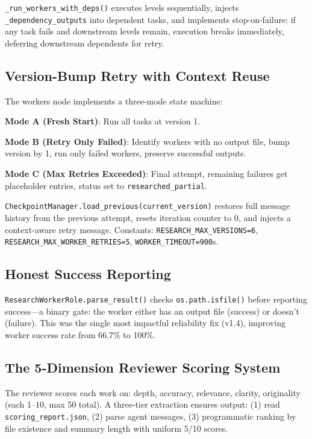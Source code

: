 \texttt{\_run\_workers\_with\_deps()} executes levels sequentially, injects \texttt{\_dependency\_outputs} into dependent tasks, and implements stop-on-failure: if any task fails and downstream levels remain, execution breaks immediately, deferring downstream dependents for retry.

\subsection{Version-Bump Retry with Context Reuse}

The workers node implements a three-mode state machine:

\textbf{Mode A (Fresh Start)}: Run all tasks at version 1.

\textbf{Mode B (Retry Only Failed)}: Identify workers with no output file, bump version by 1, run only failed workers, preserve successful outputs.

\textbf{Mode C (Max Retries Exceeded)}: Final attempt, remaining failures get placeholder entries, status set to \texttt{researched\_partial}.

\texttt{CheckpointManager.load\_previous(current\_version)} restores full message history from the previous attempt, resets iteration counter to 0, and injects a context-aware retry message. Constants: \texttt{RESEARCH\_MAX\_VERSIONS=6}, \texttt{RESEARCH\_MAX\_WORKER\_RETRIES=5}, \texttt{WORKER\_TIMEOUT=900}s.

\subsection{Honest Success Reporting}

\texttt{ResearchWorkerRole.parse\_result()} checks \texttt{os.path.isfile()} before reporting success---a binary gate: the worker either has an output file (success) or doesn't (failure). This was the single most impactful reliability fix (v1.4), improving worker success rate from 66.7\% to 100\%.

\subsection{The 5-Dimension Reviewer Scoring System}

The reviewer scores each work on: depth, accuracy, relevance, clarity, originality (each 1--10, max 50 total). A three-tier extraction ensures output: (1) read \texttt{scoring\_report.json}, (2) parse agent messages, (3) programmatic ranking by file existence and summary length with uniform 5/10 scores.

